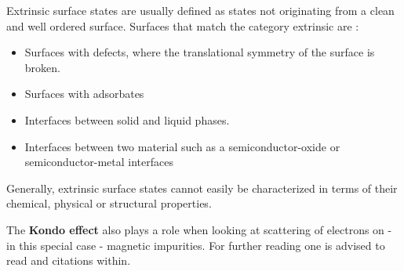 Extrinsic surface states are usually defined as states not originating from a clean and well ordered surface. Surfaces that match the category extrinsic are :
\begin{itemize}
 \item Surfaces with defects, where the translational symmetry of the surface is broken.
 \item Surfaces with adsorbates
 \item Interfaces between solid and liquid phases.
 \item Interfaces between two material such as a semiconductor-oxide or semiconductor-metal interfaces
\end{itemize}
Generally, extrinsic surface states cannot easily be characterized in terms of their chemical, physical or structural properties.

The  \textbf{Kondo effect} also plays a role when looking at scattering of electrons on - in this special case - magnetic impurities. For further reading one is advised to read \cite{kouwenhoven_revival_2001} and citations within.